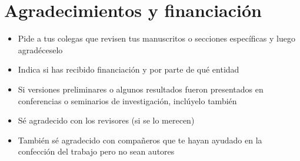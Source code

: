 \documentclass[
]{book}
\providecommand{\tightlist}{%
  \setlength{\itemsep}{0pt}\setlength{\parskip}{0pt}}
\begin{document}
\hypertarget{agradecimientos-y-financiaciuxf3n}{%
\chapter{Agradecimientos y financiación}\label{agradecimientos-y-financiaciuxf3n}}

\begin{itemize}
\tightlist
\item
  Pide a tus colegas que revisen tus manuscritos o secciones específicas y luego agradéceselo
\item
  Indica si has recibido financiación y por parte de qué entidad
\item
  Si versiones preliminares o algunos resultados fueron presentados en conferencias o seminarios de investigación, inclúyelo también
\item
  Sé agradecido con los revisores (si se lo merecen)
\item
  También sé agradecido con compañeros que te hayan ayudado en la confección del trabajo pero no sean autores
\end{itemize}

  
\end{document}

